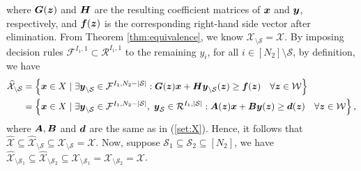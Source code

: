 \documentclass[fleqn,isre,blindrev]{informs4}
\newcommand{\mb}[1]{\mbox{\boldmath \ensuremath{#1}}}
\begin{document}
	where $\mb{G}(\mb{z})$ and $\mb{H}$ are the resulting coefficient matrices of $\mb{x}$ and $\mb{y}$, respectively, and $\mb{f}(\mb{z})$ is the corresponding right-hand side vector after elimination. From Theorem \ref{thm:equivalence}, we know $\mathcal{X}_{\setminus \mathcal{S}} = \mathcal{X}$. By imposing decision rules  $\mathcal{F}^{I_1,1}\subset \mathcal{R}^{I_1,1}$ to the remaining $y_i$, for all $i \in [N_2]\setminus \mathcal{S}$, by definition, we have
\begin{align*}
		\widehat{\mathcal{X}}_{\setminus \mathcal{S}} & = \left\{ \mb{x}\in X \hspace{3pt} | \hspace{3pt}  \exists  \mb{y}_{\setminus \mathcal{S}} \in \mathcal{F}^{I_1,N_2-|\mathcal{S}|}: \mb{G}(\mb{z})\mb{x}+\mb{H}\mb{y}_{\setminus \mathcal{S}}(\mb{z}) \geq \mb{f}(\mb{z}) \quad \forall \mb{z} \in \mathcal{W}\right\}\\
		& = \left\{ \mb{x} \in X \hspace{3pt} | \hspace{3pt}  \exists   \mb{y}_{\setminus \mathcal{S}} \in \mathcal{F}^{I_1,N_2-|\mathcal{S}|}, \hspace{3pt} \mb{y}_{\mathcal{S}} \in \mathcal{R}^{I_1,|\mathcal{S}|}: \mb{A}(\mb{z})\mb{x}+\mb{B}\mb{y}(\mb{z}) \geq \mb{d}(\mb{z}) \quad  \forall \mb{z} \in \mathcal{W} \right\}, 
\end{align*}
	where $\mb{A}, \mb{B}$ and $\mb{d}$ are the same as in (\ref{set:X}). Hence, it follows that $\widehat{\mathcal{X}} \subseteq  \widehat{\mathcal{X}}_{\setminus \mathcal{S}} \subseteq \mathcal{X}_{\setminus \mathcal{S}} = \mathcal{X}$. Now, suppose $\mathcal{S}_1 \subseteq \mathcal{S}_2 \subseteq [N_2]$, we have  $\widehat{\mathcal{X}}_{\setminus \mathcal{S}_1}  \subseteq  \widehat{\mathcal{X}}_{\setminus \mathcal{S}_2} \subseteq \mathcal{X}_{\setminus \mathcal{S}_1}= \mathcal{X}_{\setminus \mathcal{S}_2}  = \mathcal{X}$.  \hfill \Halmos \\
	
\end{document}
